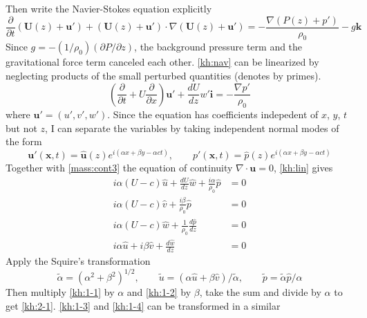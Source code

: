 Then write the Navier-Stokes equation explicitly
\begin{equation}\label{kh:nav}
\frac{\partial}{\partial
t}(\mathbf{U}(z)+\mathbf{u}')+(\mathbf{U}(z)+\mathbf{u}')
\cdot\nabla(\mathbf{U}(z)+\mathbf{u}')=-\frac{\nabla(P(z)+p')}{\rho_0}-g\mathbf{k}
\end{equation}
Since $g=-(1/\rho_0)(\partial P/\partial z)$, the background
pressure term and the gravitational force term canceled each other.
\eqref{kh:nav} can be linearized by neglecting products of the small
perturbed quantities (denotes by primes).
\begin{equation}\label{kh:lin}
(\frac{\partial}{\partial t}+U\frac{\partial}{\partial
x})\mathbf{u}'+\frac{dU}{dz}w'\mathbf{i}=-\frac{\nabla p'}{\rho_0}
\end{equation}
where $\mathbf{u}' = (u',v',w')$. Since the equation has
coefficients indepedent of $x$, $y$, $t$ but not $z$, I can separate
the variables by taking independent normal modes of the form
\begin{equation}\label{kh:modes}
    \mathbf{u}'(\mathbf{x},t)=\hat{\mathbf{u}}(z)e^{i(\alpha x+\beta y-\alpha c t)},\qquad
    p'(\mathbf{x},t)=\hat{p}(z)e^{i(\alpha x+\beta y-\alpha c t)}
\end{equation}
Together with \eqref{mass:cont3} the equation of continuity
$\nabla\cdot\mathbf{u}=0$, \eqref{kh:lin} gives
\begin{subequations}\label{kh:1}
\begin{align}
i\alpha(U-c)\hat{u}+\frac{dU}{dz}\hat{w}+\frac{i\alpha}{\rho_0}\hat{p}&=0\label{kh:1-1}\\
i\alpha(U-c)\hat{v}+\frac{i\beta}{\rho_0}\hat{p}&=0\label{kh:1-2}\\
i\alpha(U-c)\hat{w}+\frac{1}{\rho_0}\frac{d\hat{p}}{dz}&=0\label{kh:1-3}\\
i\alpha\hat{u}+i\beta\hat{v}+\frac{d\hat{w}}{dz}&=0\label{kh:1-4}
\end{align}
\end{subequations}
Apply the Squire's transformation
\begin{equation}\label{kh:squire}
    \tilde{\alpha}=(\alpha^2+\beta^2)^{1/2},\qquad
\tilde{u}=(\alpha\hat{u}+\beta\hat{v})/\tilde{\alpha},\qquad
\tilde{p}=\tilde{\alpha}\hat{p}/\alpha
\end{equation}
Then multiply \eqref{kh:1-1} by $\alpha$ and \eqref{kh:1-2} by
$\beta$, take the sum and divide by $\alpha$ to get \eqref{kh:2-1}.
\eqref{kh:1-3} and \eqref{kh:1-4} can be transformed in a similar
